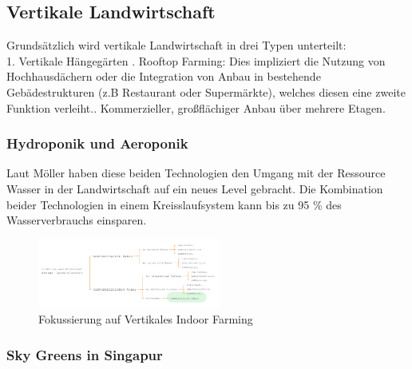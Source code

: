 \documentclass{scrartcl}
\begin{document}
\subsection{Vertikale Landwirtschaft}

Grundsätzlich wird vertikale Landwirtschaft in drei Typen unterteilt:\\ 

1. Vertikale Hängegärten . Rooftop Farming: Dies impliziert die Nutzung von Hochhausdächern oder die Integration von Anbau in bestehende Gebädestrukturen (z.B Restaurant oder Supermärkte), welches diesen eine zweite Funktion verleiht.. Kommerzieller, großflächiger Anbau über mehrere Etagen.

\subsubsection{Hydroponik und Aeroponik}
Laut Möller haben diese beiden Technologien den Umgang mit der Ressource Wasser in der Landwirtschaft auf ein neues Level gebracht. Die Kombination beider Technologien in einem Kreisslaufsystem kann bis zu 95 \% des Wasserverbrauchs einsparen.

\begin{figure}[htbp]
\centering
\includegraphics[width=6cm]{image_folder/moglicheEinteilungena_s32.png}
\caption{Fokussierung auf Vertikales Indoor Farming}
\label{fig:Fokussierung auf Vertikales Indoor Farming}
\end{figure}

\subsubsection{Sky Greens in Singapur}
\end{document}
